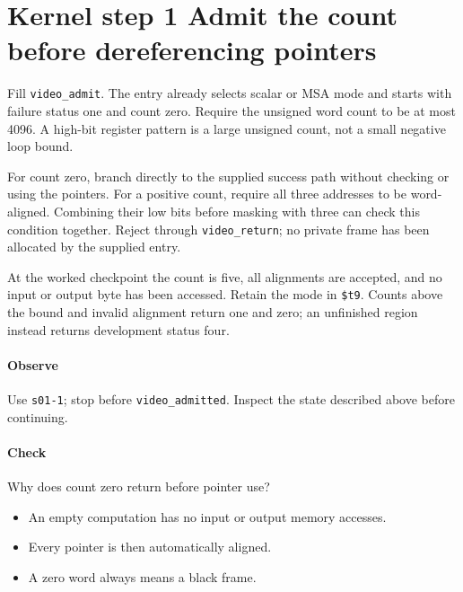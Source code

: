 \section{Kernel step 1 Admit the count before dereferencing pointers}
Fill \texttt{video\_admit}. The entry already selects scalar or MSA mode and starts with failure status one and count zero. Require the unsigned word count to be at most 4096. A high-bit register pattern is a large unsigned count, not a small negative loop bound.

For count zero, branch directly to the supplied success path without checking or using the pointers. For a positive count, require all three addresses to be word-aligned. Combining their low bits before masking with three can check this condition together. Reject through \texttt{video\_return}; no private frame has been allocated by the supplied entry.

At the worked checkpoint the count is five, all alignments are accepted, and no input or output byte has been accessed. Retain the mode in \texttt{\$t9}. Counts above the bound and invalid alignment return one and zero; an unfinished region instead returns development status four.

\paragraph{Observe} Use \texttt{s01-1}; stop before \texttt{video\_admitted}. Inspect the state described above before continuing.

\paragraph{Check} Why does count zero return before pointer use?
\begin{itemize}
\item[A.] An empty computation has no input or output memory accesses.
\item[B.] Every pointer is then automatically aligned.
\item[C.] A zero word always means a black frame.
\end{itemize}
